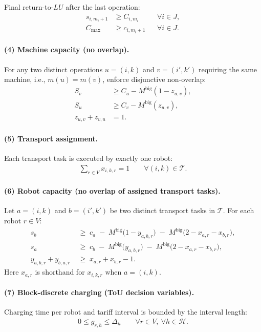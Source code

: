 \documentclass[preprint, 3p, review, 12pt]{elsarticle}
\begin{document}
Final return-to-$LU$ after the last operation:
\begin{align}
s_{i,m_i+1} &\ge C_{i,m_i} && \forall i\in J,
\label{eq:return_pickup}
\\
C_{\max} &\ge c_{i,m_i+1} && \forall i\in J.
\label{eq:makespan_def}
\end{align}

\paragraph{(4) Machine capacity (no overlap).}
For any two distinct operations $u=(i,k)$ and $v=(i',k')$ requiring the same machine,
i.e., $m(u)=m(v)$, enforce disjunctive non-overlap:
\begin{align}
S_v &\ge C_u - M^{\mathrm{big}}(1-z_{u,v}),
\label{eq:mach_disj_1}
\\
S_u &\ge C_v - M^{\mathrm{big}}(z_{u,v}),
\label{eq:mach_disj_2}
\\
z_{u,v}+z_{v,u} &= 1.
\label{eq:mach_disj_3}
\end{align}

\paragraph{(5) Transport assignment.}
Each transport task is executed by exactly one robot:
\begin{align}
\sum_{r\in V} x_{i,k,r} = 1
\qquad \forall (i,k)\in\mathcal{T}.
\label{eq:assign}
\end{align}

\paragraph{(6) Robot capacity (no overlap of assigned transport tasks).}
Let $a=(i,k)$ and $b=(i',k')$ be two distinct transport tasks in $\mathcal{T}$.
For each robot $r\in V$:
\begin{align}
s_b \;&\ge\; c_a
\;-\; M^{\mathrm{big}}\big(1-y_{a,b,r}\big)
\;-\; M^{\mathrm{big}}\big(2-x_{a,r}-x_{b,r}\big),
\label{eq:rob_disj_1}
\\
s_a \;&\ge\; c_b
\;-\; M^{\mathrm{big}}\big(y_{a,b,r}\big)
\;-\; M^{\mathrm{big}}\big(2-x_{a,r}-x_{b,r}\big),
\label{eq:rob_disj_2}
\\
y_{a,b,r}+y_{b,a,r} \;&\ge\; x_{a,r}+x_{b,r}-1.
\label{eq:rob_disj_3}
\end{align}
Here $x_{a,r}$ is shorthand for $x_{i,k,r}$ when $a=(i,k)$.

\paragraph{(7) Block-discrete charging (ToU decision variables).}
Charging time per robot and tariff interval is bounded by the interval length:
\begin{align}
0 \le g_{r,h} \le \Delta_h
\qquad \forall r\in V,\ \forall h\in\mathcal{H}.
\label{eq:g_bounds}
\end{align}
\end{document}
